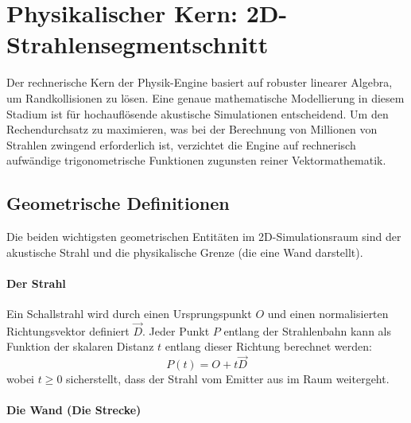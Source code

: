 \documentclass{article}
\begin{document}
    \section{Physikalischer Kern: 2D-Strahlensegmentschnitt}
    \label{sec:2d_ray_intersection}

    Der rechnerische Kern der Physik-Engine basiert auf robuster linearer Algebra, um Randkollisionen zu lösen.
    Eine genaue mathematische Modellierung in diesem Stadium ist für hochauflösende akustische Simulationen entscheidend.
    Um den Rechendurchsatz zu maximieren, was bei der Berechnung von Millionen von Strahlen zwingend erforderlich ist, verzichtet die Engine auf
    rechnerisch aufwändige trigonometrische Funktionen zugunsten reiner Vektormathematik.

    \subsection{Geometrische Definitionen}\label{subsec:geometric-definitions}

    Die beiden wichtigsten geometrischen Entitäten im 2D-Simulationsraum sind der akustische Strahl und die physikalische Grenze (die eine Wand darstellt).

    \paragraph{Der Strahl}
    Ein Schallstrahl wird durch einen Ursprungspunkt $O$ und einen normalisierten Richtungsvektor definiert $\vec{D}$.
    Jeder Punkt $P$ entlang der Strahlenbahn kann als Funktion der skalaren Distanz $t$ entlang dieser Richtung berechnet werden:
    \[P(t) = O + t\vec{D}\]
    wobei $t \ge 0$ sicherstellt, dass der Strahl vom Emitter aus im Raum weitergeht.

    \paragraph{Die Wand (Die Strecke)}
\end{document}
